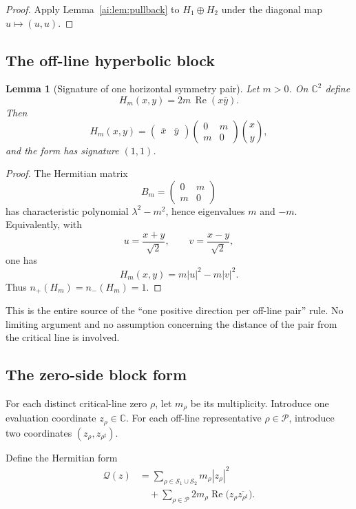 \documentclass[11pt]{article}
\newtheorem{lemma}[theorem]{Lemma}
\newcommand{\C}{\mathbb C}
\newcommand{\cS}{\mathcal S}
\newcommand{\cP}{\mathcal P}
\begin{document}
\begin{proof}
Apply Lemma~\ref{ai:lem:pullback} to $H_1\oplus H_2$ under the diagonal map
$u\mapsto(u,u)$.
\end{proof}

\subsection{The off-line hyperbolic block}

\begin{lemma}[Signature of one horizontal symmetry pair]\label{ai:lem:block}
Let $m>0$.  On $\C^2$ define
\[
 H_m(x,y)=2m\,\operatorname{Re}(x\overline y).
\]
Then
\[
 H_m(x,y)
 =
 \begin{pmatrix}\overline x&\overline y\end{pmatrix}
 \begin{pmatrix}0&m\\m&0\end{pmatrix}
 \binom{x}{y},
\]
and the form has signature $(1,1)$.
\end{lemma}

\begin{proof}
The Hermitian matrix
\[
 B_m=\begin{pmatrix}0&m\\m&0\end{pmatrix}
\]
has characteristic polynomial $\lambda^2-m^2$, hence eigenvalues
$m$ and $-m$.  Equivalently, with
\[
 u=\frac{x+y}{\sqrt2},\qquad v=\frac{x-y}{\sqrt2},
\]
one has
\[
 H_m(x,y)=m|u|^2-m|v|^2.
\]
Thus $n_+(H_m)=n_-(H_m)=1$.
\end{proof}

This is the entire source of the ``one positive direction per off-line
pair'' rule.  No limiting argument and no assumption concerning the distance
of the pair from the critical line is involved.

\subsection{The zero-side block form}

For each distinct critical-line zero $\rho$, let $m_\rho$ be its
multiplicity.  Introduce one evaluation coordinate $z_\rho\in\C$.  For each
off-line representative $\rho\in\cP$, introduce two coordinates
$(z_\rho,z_{\rho^\sharp})$.

Define the Hermitian form
\begin{align}
 \mathcal Q(z)
 &=
 \sum_{\rho\in\cS_1\cup\cS_2}
 m_\rho |z_\rho|^2 \nonumber\\
 &\quad+
 \sum_{\rho\in\cP}
 2m_\rho\operatorname{Re}
 \bigl(z_\rho\overline{z_{\rho^\sharp}}\bigr).
 \label{ai:eq:Q}
\end{align}
\end{document}
